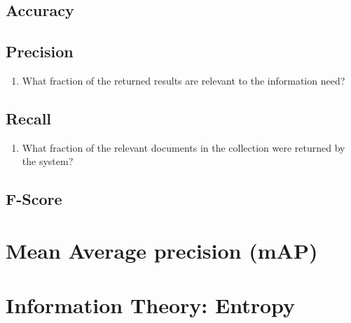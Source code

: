 \subsection{Accuracy}

\subsection{Precision}
\begin{enumerate}
    \item What fraction of the returned results are relevant to the information need? \cite{ir-1}
\end{enumerate}

\subsection{Recall}
\begin{enumerate}
    \item What fraction of the relevant documents in the collection were returned by the system? \cite{ir-1}
\end{enumerate}

\subsection{F-Score}


\section{Mean Average precision (mAP)}\label{Mean Average precision (mAP)}


\section{Information Theory: Entropy \cite{dnn-1}} \label{Information Theory: Entropy}

